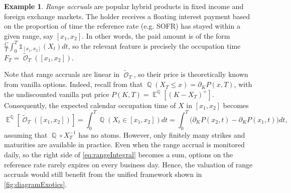 \documentclass[11pt]{article}
\theoremstyle{plain}
\theoremstyle{definition}
\newtheorem{example}{Example}
\DeclareMathOperator{\E}{\mathbb{E}}
\DeclareMathOperator{\Q}{\mathbb{Q}}
\DeclareMathOperator{\calO}{\mathcal{O}}
\begin{document}
\begin{example} %
\label{ex:rangeAccrual} \emph{Range accruals} are popular hybrid products in fixed income and foreign exchange markets. The holder receives a floating interest payment based on the proportion of time the reference rate (e.g. SOFR) has stayed within   a given range, say $[x_1,x_2]$. %
In other words, the paid amount is of the form $\frac{C}{T}\int_0^T \mathds{1}_{[x_1,x_2]}(X_t)dt$, so the relevant feature %
is precisely the occupation time $F_T = \tilde{\calO}_T([x_1,x_2])$. %

Note that range accruals are linear  in $\tilde{\calO}_T$, so their price is  theoretically known from vanilla options. Indeed,  recall from  \citet{BreedenLitzenberger} that %
$\Q(X_T\le x) = \partial_K P(x,T)$, with the undiscounted vanilla put price  $P(K,T) = \E^{\Q}[(K-X_T)^+]$. Consequently, the expected calendar occupation time of $X$ in $[x_1,x_2]$ becomes  
\begin{equation}\label{eq:rangeIntegral}
    \E^{\Q}[\tilde{\calO}_T([x_1,x_2])] = \int_0^T \Q(X_t \in [x_1,x_2])dt =    \int_0^T \big( \partial_K P(x_2,t) - \partial_K P(x_1,t)\big)dt, 
\end{equation} 
assuming that $\Q\circ X_T^{-1}$ has no atoms. 
However, only finitely many strikes and maturities are available in practice. Even when the range accrual is monitored daily, so the right side of \eqref{eq:rangeIntegral} becomes a sum, options on the reference rate rarely expires on every business day. Hence, the valuation of range accruals  would still benefit from the unified  framework shown in  \cref{fig:diagramExotics}. %
\end{example}

\end{document}
